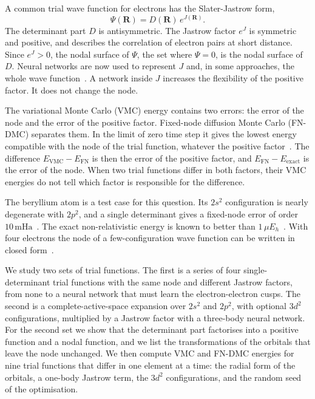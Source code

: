 \documentclass[aps,prb,reprint,amsmath,amssymb,superscriptaddress,nofootinbib]{revtex4-2}
\newcommand{\mHa}{\,\mathrm{mHa}}
\begin{document}
A common trial wave function for electrons has the Slater-Jastrow form,
\begin{equation}
    \Psi(\mathbf{R}) = D(\mathbf{R})\, e^{J(\mathbf{R})} .
    \label{eq:slater_jastrow}
\end{equation}
The determinant part $D$ is antisymmetric. The Jastrow factor $e^{J}$ is
symmetric and positive, and describes the correlation of electron pairs at
short distance. Since $e^{J} > 0$, the nodal surface of $\Psi$, the set where
$\Psi = 0$, is the nodal surface of $D$. Neural networks are now used to
represent $J$ and, in some approaches, the whole wave
function~\cite{carleo2017,pfau2020,hermann2020}. A network inside $J$
increases the flexibility of the positive factor. It does not change the node.

The variational Monte Carlo (VMC) energy contains two errors: the error of the
node and the error of the positive factor. Fixed-node diffusion Monte Carlo
(FN-DMC) separates them. In the limit of zero time step it gives the lowest
energy compatible with the node of the trial function, whatever the positive
factor~\cite{reynolds1982,foulkes2001}. The difference
$E_{\mathrm{VMC}} - E_{\mathrm{FN}}$ is then the error of the positive factor,
and $E_{\mathrm{FN}} - E_{\mathrm{exact}}$ is the error of the node. When two
trial functions differ in both factors, their VMC energies do not tell which
factor is responsible for the difference.

The beryllium atom is a test case for this question. Its $2s^2$ configuration
is nearly degenerate with $2p^2$, and a single determinant gives a fixed-node
error of order $10\mHa$~\cite{todobehfnode}. The exact non-relativistic
energy is known to better than $1\,\mu E_h$~\cite{pachucki2006}. With four
electrons the node of a few-configuration wave function can be written in
closed form~\cite{bressanini_nodes}.

We study two sets of trial functions. The first is a series of four
single-determinant trial functions with the same node and different Jastrow
factors, from none to a neural network that must learn the electron-electron
cusps. The second is a complete-active-space expansion over $2s^2$ and $2p^2$,
with optional $3d^2$ configurations, multiplied by a Jastrow factor with a
three-body neural network. For the second set we show that the determinant
part factorises into a positive function and a nodal function, and we list
the transformations of the orbitals that leave the node unchanged. We then
compute VMC and FN-DMC energies for nine trial functions that differ in one
element at a time: the radial form of the orbitals, a one-body Jastrow term,
the $3d^2$ configurations, and the random seed of the optimisation.
\end{document}
